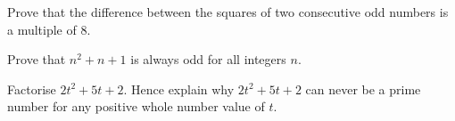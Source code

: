 \documentclass[11pt, a4paper]{exam}
\begin{document}
\begin{questions}
		\clearpage
		\question Prove that the difference between the squares of two consecutive odd numbers is a multiple of $8$.

		\question Prove that $n^2 + n + 1$ is always odd for all integers $n$.

		\question Factorise $2t^2 + 5t + 2$. Hence explain why $2t^2 + 5t + 2$ can never be a prime number for any positive whole number value of $t$.
	\end{questions}
\end{document}
